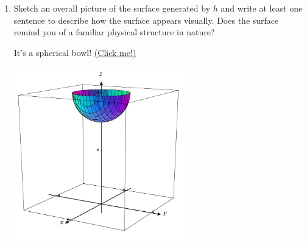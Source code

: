 \begin{enumerate}[leftmargin=0pt]
\begin{enumerate}
        \item Sketch an overall picture of the surface generated by $h$ and write at least one sentence to describe how the surface appears visually. Does the surface remind you of a familiar physical structure in nature?
        
        \begin{red}
            It's a spherical bowl! \href{https://c3d.libretexts.org/CalcPlot3D/index.html?type=z;z=8-sqrt(4-x%5E2-y%5E2);funname=f;visible=true;umin=-4;umax=4;vmin=-4;vmax=4;grid=31;format=normal;alpha=-1;hidemyedges=false;constcol=rgb(255,0,0);view=0;contourcolor=red;fixdomain=false;activetrace=false;contourplot=true;showcontourplot=false;firstvalue=-1;stepsize=0.2;numlevels=11;list=;uselist=false;xnum=46;ynum=46;show2d=false;hidesurface=false;hidelabels=true;showprojections=false;surfacecontours=true;projectioncolor=rgba(255,0,0,1);showxygrid=false;showxygridonbox=false;showconstraint=false&type=window;showfunnot=false;hsrmode=0;nomidpts=true;anaglyph=-1;center=8.236391035463319,4.755282581475766,3.0901699437494745,1;focus=0,0,0,1;up=0,0,2,1;transparent=false;alpha=140;twoviews=false;unlinkviews=false;axisextension=0.7;shownormals=false;shownormalsatpts=false;xaxislabel=x;yaxislabel=y;zaxislabel=z;edgeson=true;faceson=true;showbox=true;showaxes=true;showticks=true;perspective=true;centerxpercent=0.5;centerypercent=0.7500000000000002;rotationsteps=30;autospin=true;xygrid=false;yzgrid=false;xzgrid=false;gridsonbox=true;gridplanes=false;gridcolor=rgb(128,128,128);lastaddedsurfaceactive=true;disabletrace=false;activefun=-1;xmin=-4;xmax=4;ymin=-4;ymax=4;zmin=0;zmax=8;xscale=4;yscale=4;zscale=4;zcmin=-16;zcmax=16;xscalefactor=1;yscalefactor=1;zscalefactor=1;tracemode=0;keep2d=false;zoom=0.576471}{(Click me!)}

            \begin{center}
                \includegraphics[width=0.6\textwidth]{../images/9-1-17-bowl.png}
            \end{center}
        \end{red}
    \end{enumerate}
\end{enumerate}

